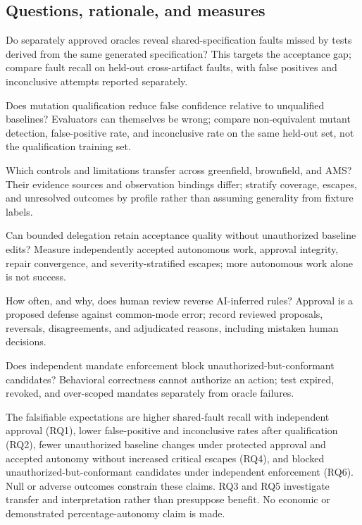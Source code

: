 \documentclass[11pt,a4paper]{article}
\begin{document}
\subsection{Questions, rationale, and measures}
\begin{description}[leftmargin=1.5em,style=nextline]
\item[RQ1: Independent fault detection.] Do separately approved oracles reveal shared-specification faults missed by tests derived from the same generated specification? This targets the acceptance gap; compare fault recall on held-out cross-artifact faults, with false positives and inconclusive attempts reported separately.
\item[RQ2: Oracle qualification.] Does mutation qualification reduce false confidence relative to unqualified baselines? Evaluators can themselves be wrong; compare non-equivalent mutant detection, false-positive rate, and inconclusive rate on the same held-out set, not the qualification training set.
\item[RQ3: Scope and transfer.] Which controls and limitations transfer across greenfield, brownfield, and AMS? Their evidence sources and observation bindings differ; stratify coverage, escapes, and unresolved outcomes by profile rather than assuming generality from fixture labels.
\item[RQ4: Governed autonomy.] Can bounded delegation retain acceptance quality without unauthorized baseline edits? Measure independently accepted autonomous work, approval integrity, repair convergence, and severity-stratified escapes; more autonomous work alone is not success.
\item[RQ5: Human interpretation.] How often, and why, does human review reverse AI-inferred rules? Approval is a proposed defense against common-mode error; record reviewed proposals, reversals, disagreements, and adjudicated reasons, including mistaken human decisions.
\item[RQ6: Authorization boundary.] Does independent mandate enforcement block unauthorized-but-conformant candidates? Behavioral correctness cannot authorize an action; test expired, revoked, and over-scoped mandates separately from oracle failures.
\end{description}

The falsifiable expectations are higher shared-fault recall with independent approval (RQ1), lower false-positive and inconclusive rates after qualification (RQ2), fewer unauthorized baseline changes under protected approval and accepted autonomy without increased critical escapes (RQ4), and blocked unauthorized-but-conformant candidates under independent enforcement (RQ6). Null or adverse outcomes constrain these claims. RQ3 and RQ5 investigate transfer and interpretation rather than presuppose benefit. No economic or demonstrated percentage-autonomy claim is made.
\end{document}
